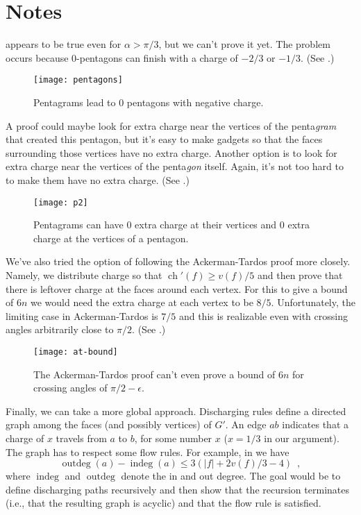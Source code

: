 \documentclass[lotsofwhite,charterfonts]{patmorin}
\DeclareMathOperator{\ch}{ch}
\DeclareMathOperator{\ind}{indeg}
\DeclareMathOperator{\outd}{outdeg}
\begin{document}
\section{Notes}

 appears to be true even for $\alpha > \pi/3$, but we can't
prove it yet.  The problem occurs because 0-pentagons can finish with
a charge of $-2/3$ or $-1/3$. (See .) 

\begin{figure}
  \begin{center}
    \texttt{[image: pentagons]}
  \end{center}
  \caption{Pentagrams lead to 0 pentagons with negative charge.}
\end{figure}

A proof could maybe look for extra charge near the vertices of the
penta\emph{gram} that created this pentagon, but it's easy to make gadgets
so that the faces surrounding those vertices have no extra charge.  Another
option is to look for extra charge near the vertices of the penta\emph{gon}
itself. Again, it's not too hard to to make them have no extra charge.
(See .)

\begin{figure}
  \begin{center}
    \texttt{[image: p2]}
  \end{center}
  \caption{Pentagrams can have 0 extra charge at their vertices and
           0 extra charge at the vertices of a pentagon.}
\end{figure}


We've also tried the option of following the Ackerman-Tardos proof more
closely. Namely, we distribute charge so that $\ch'(f)\ge v(f)/5$ and then
prove that there is leftover charge at the faces around each vertex.  For
this to give a bound of $6n$ we would need the extra charge at each vertex
to be $8/5$.  Unfortunately, the limiting case in Ackerman-Tardos is $7/5$
and this is realizable even with crossing angles arbitrarily close to
$\pi/2$. (See .)

\begin{figure}
  \begin{center}
    \texttt{[image: at-bound]}
  \end{center}
  \caption{The Ackerman-Tardos proof can't even prove a bound of $6n$ for
           crossing angles of $\pi/2-\epsilon$.}
\end{figure}

Finally, we can take a more global approach.  Discharging rules define a
directed graph among the faces (and possibly vertices) of $G'$.  An edge
$ab$ indicates that a charge of $x$ travels from $a$ to $b$, for some
number $x$ ($x=1/3$ in our argument).  The graph has to respect some flow
rules.  For example, in  we have 
\[
    \outd(a) - \ind(a) \le 3(|f| + 2v(f)/3 - 4) \enspace ,
\]
where $\ind$ and $\outd$ denote the in and out degree.  The goal would be
to define discharging paths recursively and then show that the recursion
terminates (i.e., that the resulting graph is acyclic) and that the flow
rule is satisfied.
\end{document}
